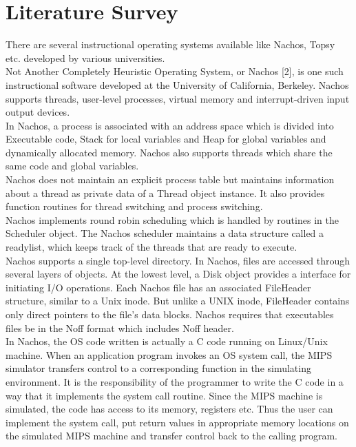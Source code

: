 \chapter{Literature Survey}
\label{chap3}

There are several instructional operating systems available like Nachos, Topsy etc. developed by various universities.\\

Not Another Completely Heuristic Operating System, or Nachos [2], is one such instructional software developed at the University of California, Berkeley. Nachos supports threads, user-level processes, virtual memory and interrupt-driven input output devices.\\ 

In Nachos, a process is associated with an address space which is divided into Executable code, Stack for local variables and Heap for global variables and dynamically allocated memory. Nachos also supports threads which share the same code and global variables.\\

Nachos does not maintain an explicit process table but maintains information about a thread  as private data of a Thread object instance. It also provides function routines for thread switching and process switching. \\

Nachos implements round robin scheduling which is handled by routines in the Scheduler object. The Nachos scheduler maintains a data structure called a readylist, which keeps track of the threads that are ready to execute.\\

Nachos supports a single top-level directory. In Nachos, files are accessed through several layers of objects. At the lowest level, a Disk object provides a interface for initiating I/O operations. Each Nachos file has an associated FileHeader structure, similar to a Unix inode. But unlike  a UNIX inode, FileHeader contains only direct pointers to the file's data blocks. Nachos requires that executables files be in the Noff format which includes Noff header.\\ 

In Nachos, the OS code written is actually a C code running on Linux/Unix machine. When an application program invokes an OS system call, the MIPS simulator transfers control to a corresponding function in the simulating environment. It is the responsibility of the programmer to  write the C code in a way that it implements the system call routine. Since the MIPS machine is simulated, the code has access to its memory, registers etc. Thus the user can implement the system call, put return values in appropriate memory locations on the simulated MIPS machine and transfer control back to the calling program.\\ 

